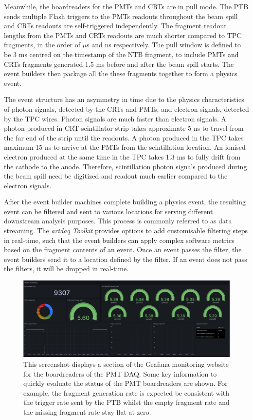 Meanwhile, the boardreaders for the PMTs and CRTs are in pull mode.
The PTB sends multiple Flash triggers to the PMTs readouts throughout the beam spill and CRTs readouts are self-triggered independently.
The fragment readout lengths from the PMTs and CRTs readouts are much shorter compared to TPC fragments, in the order of $\mu$s and ns respectively.
The pull window is defined to be 3 ms centred on the timestamp of the NTB fragment, to include PMTs and CRTs fragments generated 1.5 ms before and after the beam spill starts.
The event builders then package all the these fragments together to form a physics event.

The event structure has an asymmetry in time due to the physics characteristics of photon signals, detected by the CRTs and PMTs, and electron signals, detected by the TPC wires.
Photon signals are much faster than electron signals.
A photon produced in CRT scintillator strip takes approximate 5 ns to travel from the far end of the strip until the readouts.
A photon produced in the TPC takes maximum 15 ns to arrive at the PMTs from the scintillation location.
An ionised electron produced at the same time in the TPC takes 1.3 ms to fully drift from the cathode to the anode.
Therefore, scintillation photon signals produced during the beam spill need be digitized and readout much earlier compared to the electron signals.

After the event builder machines complete building a physics event, the resulting event can be filtered and sent to various locations for serving different downstream analysis purposes. 
This process is commonly referred to as data streaming.
The \textit{artdaq Toolkit} provides options to add customisable filtering steps in real-time, such that the event builders can apply complex software metrics based on the fragment contents of an event.
Once an event passes the filter, the event builders send it to a location defined by the filter.
If an event does not pass the filters, it will be dropped in real-time.

\begin{figure}[htbp!] 
\centering    
\includegraphics[width=1.0\textwidth]{Grafana}
\caption[Grafana]{
This screenshot displays a section of the Grafana monitoring website for the boardreaders of the PMT DAQ.
Some key information to quickly evaluate the status of the PMT boardreaders are shown.
For example, the fragment generation rate is expected be consistent with the trigger rate sent by the PTB whilst the empty fragment rate and the missing fragment rate stay flat at zero.
}
\label{fig:Grafana}
 \end{figure}

